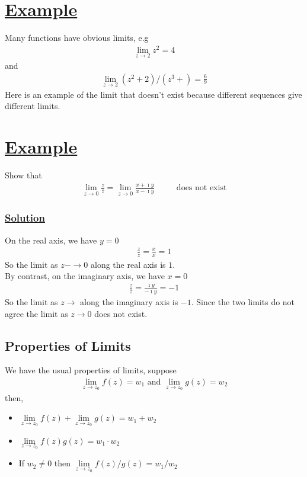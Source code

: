 \documentclass[11pt]{report}
\newcommand{\ubt}[1]{\textbf{\underline{#1}}}
\newcommand{\zbar}{\overline{z}}
\newcommand{\imaginary}{\imath}
\newcommand{\example}[1]{\section*{\ubt{Example #1}}}
\newcommand{\solution}{\subsubsection{\ubt{Solution}}}
\begin{document}
	\example{}
	Many functions have obvious limits, e.g
	\begin{eqnarray*}
		\lim\limits_{z\rightarrow 2} z^2 = 4
	\end{eqnarray*}
	and
	\begin{eqnarray*}
		\lim\limits_{z\rightarrow 2} (z^2+2)/(z^3+) = \frac{6}{9}
	\end{eqnarray*}
	Here is an example of the limit that doesn't exist because different sequences give different limits.
	\example{}
	Show that
	\begin{eqnarray*}
		\lim\limits_{z\rightarrow 0}\frac{z}{\zbar} = \lim\limits_{z\rightarrow 0} \frac{x+\imaginary y}{x - \imaginary y} \text{ ~~~~~~~does not exist}
	\end{eqnarray*}
	\solution
	On the real axis, we have $y=0$
	\begin{eqnarray*}
		\frac{z}{\zbar} = \frac{x}{x} = 1
	\end{eqnarray*}
	So the limit as $z-\rightarrow 0$ along the real axis is $1$. \\
	By contrast, on the imaginary axis, we have $x=0$
	\begin{eqnarray*}
		\frac{z}{\zbar} = \frac{\imaginary y}{-\imaginary y} = -1
	\end{eqnarray*}
	So the limit as $z\rightarrow$ along the imaginary axis is $-1$. Since the two limits do not agree the limit as $z\rightarrow 0$ does not exist.
	
	\subsection{Properties of Limits}
	We have the usual properties of limits, suppose
	\begin{eqnarray}
		\lim\limits_{z\rightarrow z_0} f(z) = w_1 \text{ and } \lim\limits_{z\rightarrow z_0} g(z) = w_2
	\end{eqnarray}
	then,
	\begin{itemize}
		\item $\lim\limits_{z\rightarrow z_0} f(z) + \lim\limits_{z\rightarrow z_0} g(z) = w_1 + w_2 $
		\item $\lim\limits_{z\rightarrow z_0} f(z)g(z) = w_1 \cdot w_2$
		\item If $w_2 \neq 0$ then $\lim\limits_{z\rightarrow z_0} f(z)/g(z) = w_1/w_2$
	\end{itemize}
	
\end{document}
